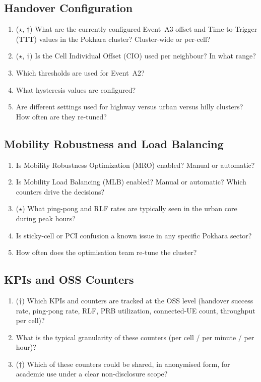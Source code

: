 \documentclass[11pt,a4paper]{article}
\begin{document}
\subsection{Handover Configuration}

\begin{enumerate}[leftmargin=*,resume]
    \item ($\star$, $\dagger$) What are the currently configured
    Event~A3 offset and Time-to-Trigger (TTT) values in the Pokhara
    cluster? Cluster-wide or per-cell?
    \item ($\star$, $\dagger$) Is the Cell Individual Offset (CIO) used
    per neighbour? In what range?
    \item Which thresholds are used for Event~A2?
    \item What hysteresis values are configured?
    \item Are different settings used for highway versus urban versus
    hilly clusters? How often are they re-tuned?
\end{enumerate}

\subsection{Mobility Robustness and Load Balancing}

\begin{enumerate}[leftmargin=*,resume]
    \item Is Mobility Robustness Optimization (MRO) enabled? Manual or
    automatic?
    \item Is Mobility Load Balancing (MLB) enabled? Manual or
    automatic? Which counters drive the decisions?
    \item ($\star$) What ping-pong and RLF rates are typically seen in
    the urban core during peak hours?
    \item Is sticky-cell or PCI confusion a known issue in any specific
    Pokhara sector?
    \item How often does the optimisation team re-tune the cluster?
\end{enumerate}

\subsection{KPIs and OSS Counters}

\begin{enumerate}[leftmargin=*,resume]
    \item ($\dagger$) Which KPIs and counters are tracked at the OSS
    level (handover success rate, ping-pong rate, RLF, PRB utilization,
    connected-UE count, throughput per cell)?
    \item What is the typical granularity of these counters
    (per cell / per minute / per hour)?
    \item ($\dagger$) Which of these counters could be shared, in
    anonymised form, for academic use under a clear non-disclosure
    scope?
\end{enumerate}
\end{document}
